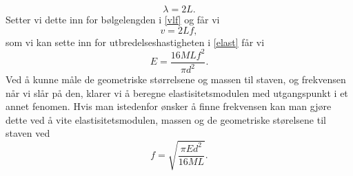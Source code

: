 \documentclass[%
 reprint,
 amsmath,amssymb,
 aps,
 norsk,
 booktabs
]{revtex4-1}
\begin{document}
\begin{equation}
  \lambda = 2L.
\end{equation}
Setter vi dette inn for bølgelengden i \eqref{vlf} og får vi
\begin{equation*}
  v = 2Lf,
\end{equation*}
som vi kan sette inn for utbredelseshastigheten i \eqref{elast} får vi
\begin{equation}
  E = \frac{16MLf^2}{\pi d^2}. \label{young5}
\end{equation}
Ved å kunne måle de geometriske størrelsene og massen til staven, og frekvensen når vi slår på den, klarer vi å beregne elastisitetsmodulen med utgangspunkt i et annet fenomen. Hvis man istedenfor ønsker å finne frekvensen kan man gjøre dette ved å vite elastisitetsmodulen, massen og de geometriske størelsene til staven ved
\begin{equation}
  f = \sqrt{\frac{\pi E d^2}{16ML}}. \label{young6}
\end{equation}
\end{document}
